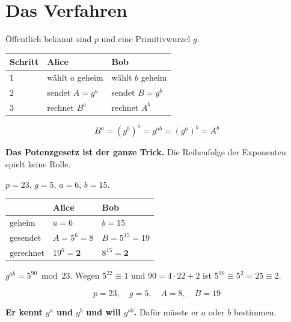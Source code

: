 \section{Das Verfahren}

\begin{merksatz}
Öffentlich bekannt sind $p$ und eine Primitivwurzel $g$.

\begin{center}
{\small
\renewcommand{\arraystretch}{1.55}
\begin{tabular}{@{}P{2.4cm}P{2.6cm}P{3.0cm}@{}}
\toprule
\textbf{Schritt} & \textbf{Alice} & \textbf{Bob}\\
\midrule
$1$ & wählt $a$ geheim & wählt $b$ geheim\\
$2$ & sendet $A = g^{a}$ & sendet $B = g^{b}$\\
$3$ & rechnet $B^{a}$ & rechnet $A^{b}$\\
\bottomrule
\end{tabular}}
\end{center}

\[ B^{a} = (g^{b})^{a} = g^{ab} = (g^{a})^{b} = A^{b} \]

\begin{center}
\begin{minipage}{0.9\textwidth}
\textbf{Das Potenzgesetz ist der ganze Trick.} Die Reihenfolge der Exponenten spielt keine Rolle.
\end{minipage}
\end{center}

$p=23$, $g=5$, $a=6$, $b=15$.

\begin{center}
{\small
\renewcommand{\arraystretch}{1.48}
\begin{tabular}{@{}P{2.2cm}P{2.8cm}P{2.8cm}@{}}
\toprule
& \textbf{Alice} & \textbf{Bob}\\
\midrule
geheim & $a = 6$ & $b = 15$\\
gesendet & $A = 5^{6} = 8$ & $B = 5^{15} = 19$\\
gerechnet & $19^{6} = \mathbf{2}$ & $8^{15} = \mathbf{2}$\\
\bottomrule
\end{tabular}}
\end{center}

 $g^{ab} = 5^{90} \bmod 23$. Wegen $5^{22}\equiv1$ und $90 = 4\cdot22+2$ ist $5^{90} \equiv 5^{2} = 25 \equiv 2$. \checkmark

\[ p = 23, \quad g = 5, \quad A = 8, \quad B = 19 \]

\begin{center}
\begin{minipage}{0.9\textwidth}
\textbf{Er kennt $g^{a}$ und $g^{b}$ und will $g^{ab}$.} Dafür müsste er $a$ oder $b$ bestimmen.
\end{minipage}
\end{center}
\end{merksatz}

